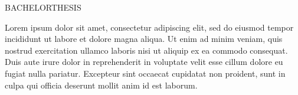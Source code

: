 \documentclass[12pt]{article}
\begin{document}
\setlength\parindent{0pt}


\begin{center}
\end{center}

\vspace{1cm}

{
\fontsize{22pt}{22pt}\selectfont
BACHELORTHESIS
}

\begin{center}
\end{center}



Lorem ipsum dolor sit amet, consectetur adipiscing elit, sed do eiusmod tempor incididunt ut labore et dolore magna aliqua.
Ut enim ad minim veniam, quis nostrud exercitation ullamco laboris nisi ut aliquip ex ea commodo consequat. Duis aute irure dolor in
reprehenderit in voluptate velit esse cillum dolore eu fugiat nulla pariatur. Excepteur sint occaecat cupidatat non proident, sunt in culpa qui
officia deserunt mollit anim id est laborum.
\end{document}
